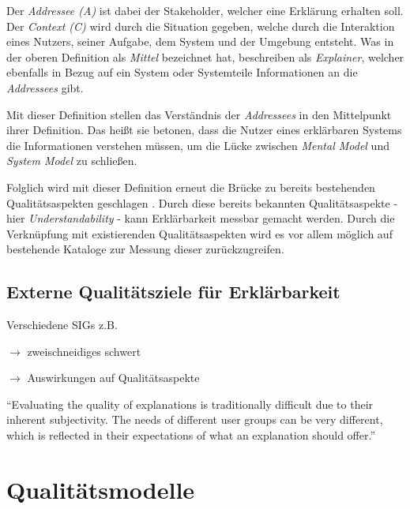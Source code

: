 \smallskip

Der \textit{Addressee (A)} ist dabei der Stakeholder, welcher eine Erklärung erhalten soll. Der \textit{Context (C)} wird durch die Situation gegeben, welche durch die Interaktion eines Nutzers, seiner Aufgabe, dem System und der Umgebung entsteht. Was \citeauthor{kohl_explainability_2019} in der oberen Definition als \textit{Mittel} bezeichnet hat, beschreiben \citeauthor{chazette_end-users_nodate} als \textit{Explainer}, welcher ebenfalls in Bezug auf ein 
System oder Systemteile Informationen an die \textit{Addressees} gibt.

Mit dieser Definition stellen \citeauthor{chazette_knowledge_nodate} das Verständnis der \textit{Addressees} in den Mittelpunkt ihrer Definition. Das heißt sie betonen, dass die Nutzer eines erklärbaren Systems die Informationen verstehen müssen, um die Lücke zwischen \textit{Mental Model} und \textit{System Model} zu schließen.

Folglich wird mit dieser Definition erneut die Brücke zu bereits bestehenden Qualitätsaspekten geschlagen \cite{chazette_end-users_nodate}. Durch diese bereits bekannten Qualitätsaspekte - hier \textit{Understandability} - kann Erklärbarkeit messbar gemacht werden. Durch die Verknüpfung mit existierenden Qualitätsaspekten wird es vor allem möglich auf bestehende Kataloge zur Messung dieser zurückzugreifen.


\subsection{Externe Qualitätsziele für Erklärbarkeit}
\label{02_basics:quality_quaracteristic}

Verschiedene SIGs z.B. \cite{do2010software}

\citeauthor{chazette_end-users_nodate} $\rightarrow$ zweischneidiges schwert

\citeauthor{chazette_knowledge_nodate} $\rightarrow$ Auswirkungen auf Qualitätsaspekte

“Evaluating the quality of explanations is traditionally difficult due to their inherent subjectivity. The needs of different user groups can be very different, which is reflected in their expectations of what an explanation should offer.” \cite{martin_developing_2019, martin_evaluating_2021}



\section{Qualitätsmodelle}
\label{sec:basics_quality_models}


